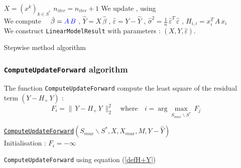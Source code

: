 \begin{algorithm}
{{
$X = (x^k)_{k \in S^*} $
}
$n_{iter} = n_{iter} + 1$
}
We update \texttt{\color{blue}{currentGramInverse\_}}, \texttt{\color{blue}{currentB\_}} using \texttt{\color{blue}{computeLogLikelihood()}} \\
We compute $\quad\hat{\beta}= \color{blue}{A\,B}$ , $\hat{Y}=X\,\hat{\beta}$ , 
$\hat{\varepsilon}=Y-\hat{Y}$ , 
$\hat{\sigma}^2 = \frac{1}{n} \,\hat{\varepsilon}^T\,\hat{\varepsilon}$ , 
$H_{i,i} = x_i^T\,A\,x_i$\\
We construct \texttt{LinearModelResult} with parameters : $(X,Y,\hat{\varepsilon})$.
\caption{Stepwise method algorithm }
\end{algorithm}

\texttt{\color{blue}{}}
\newpage
\subsubsection{\texttt{ComputeUpdateForward} algorithm}

 The function \texttt{ComputeUpdateForward} compute the least square of the residual term $(Y-H_{+}\,Y)$ : 
 \begin{equation}
\boxed{  F_i=\|\,Y-H_{+}\,Y\,\|^2_2 \quad\text{where}\quad i = \displaystyle\arg \max_{S_{max} \backslash S^*}\, F_{j}\,\, }
 \end{equation}

\IncMargin{2em}
\begin{algorithm}
\underline{\texttt{ComputeUpdateForward}}$(S_{max} \backslash S^*,X,X_{max},M,Y-\hat{Y})$\\
\BlankLine
Initialisation : $F_i = -\infty$
\BlankLine
{}
\caption{\texttt{ComputeUpdateForward} using equation (\ref{defH+Y})}
\end{algorithm}


